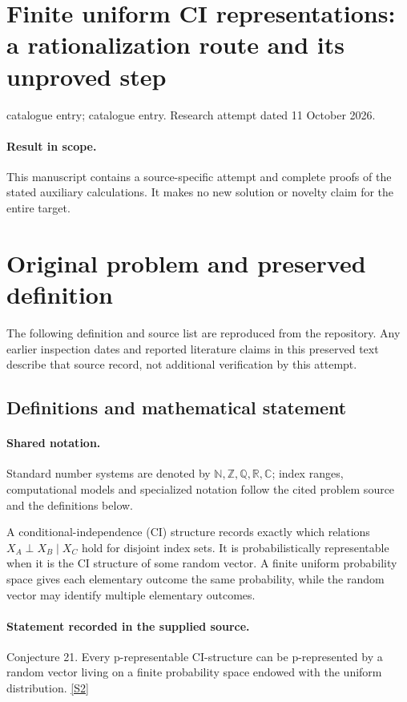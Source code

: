 \documentclass[11pt]{article}
\begin{document}
\section*{Finite uniform CI representations: a rationalization route and its unproved step}
\noindent catalogue entry; catalogue entry. Research attempt dated 11 October 2026.
\paragraph{Result in scope.}This manuscript contains a source-specific attempt and complete proofs of the stated auxiliary calculations. It makes no new solution or novelty claim for the entire target.
\section{Original problem and preserved definition}
The following definition and source list are reproduced from the repository. Any earlier inspection dates and reported literature claims in this preserved text describe that source record, not additional verification by this attempt.
\subsection{Definitions and mathematical statement}

\paragraph{Shared notation.}Standard number systems are denoted by $\mathbb N,\mathbb Z,\mathbb Q,\mathbb R,\mathbb C$; index ranges, computational models and specialized notation follow the cited problem source and the definitions below.


A conditional-independence (CI) structure records exactly which relations $X_A\perp X_B\mid X_C$ hold for disjoint index sets. It is probabilistically representable when it is the CI structure of some random vector. A finite uniform probability space gives each elementary outcome the same probability, while the random vector may identify multiple elementary outcomes.
\paragraph{Statement recorded in the supplied source.}
Conjecture 21. Every p-representable CI-structure can be p-represented by a random vector living on a finite probability space endowed with the uniform distribution. \href{https://aimath.org/WWN/compalgstat/compalgstat.pdf}{[S2]}
\end{document}

